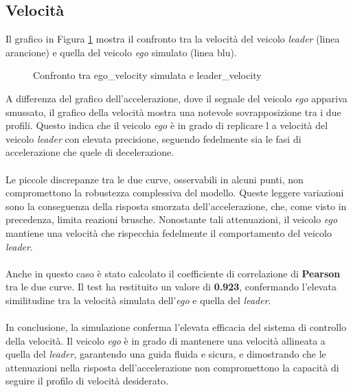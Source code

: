 \subsection{Velocità}
Il grafico in Figura \ref{fig:vel_leader_ego} mostra il confronto tra la velocità del veicolo \emph{leader} 
(linea arancione) e quella del veicolo \emph{ego} simulato (linea blu).
\begin{figure}[H]
    \centering
    \caption{Confronto tra ego\_velocity simulata e leader\_velocity}
    \label{fig:vel_leader_ego}
\end{figure}
\noindent A differenza del grafico dell'accelerazione, dove il segnale del veicolo \emph{ego} appariva smussato, il grafico della 
velocità mostra una notevole sovrapposizione tra i due profili. Questo indica che il veicolo \emph{ego} è in grado di replicare l
a velocità del veicolo \emph{leader} con elevata precisione, seguendo fedelmente sia le fasi di accelerazione che quele di decelerazione.
\\\\
\noindent Le piccole discrepanze tra le due curve, osservabili in alcuni punti, non compromettono la robustezza complessiva del modello. 
Queste leggere variazioni sono la conseguenza della risposta smorzata dell'accelerazione, che, come visto in precedenza, 
limita reazioni brusche. Nonostante tali attenuazioni, il veicolo \emph{ego} mantiene una velocità che rispecchia fedelmente 
il comportamento del veicolo \emph{leader}.
\\\\
\noindent Anche in questo caso è stato calcolato il coefficiente di correlazione 
di \textbf{Pearson} tra le due curve. Il test ha restituito un valore di \textbf{0.923}, confermando l'elevata similitudine tra la 
velocità simulata dell'\emph{ego} e quella del \emph{leader}.
\\\\
\noindent In conclusione, la simulazione conferma l'elevata efficacia del sistema di controllo della velocità. Il veicolo \emph{ego}
è in grado di mantenere una velocità allineata a quella del \emph{leader}, garantendo una guida fluida e sicura, 
e dimostrando che le attenuazioni nella risposta dell'accelerazione non compromettono la capacità di seguire il profilo di velocità 
desiderato.